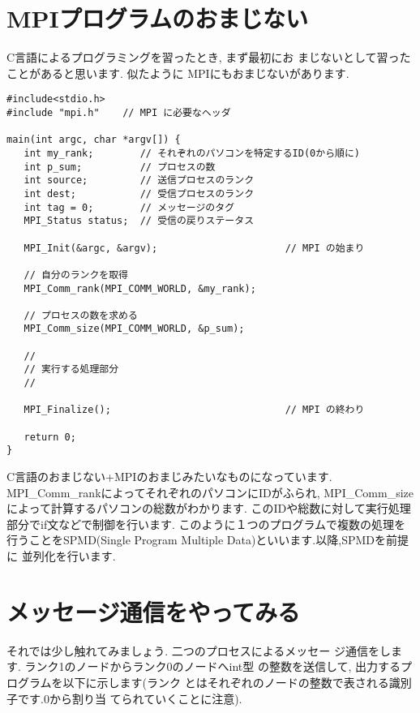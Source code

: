 \documentclass[a4paper,titlepage]{jreport}
\begin{document}
\section{MPIプログラムのおまじない}
C言語によるプログラミングを習ったとき, まず最初にお
まじないとして習ったことがあると思います. 似たように
MPIにもおまじないがあります.

\begin{verbatim}
#include<stdio.h>
#include "mpi.h"    // MPI に必要なヘッダ

main(int argc, char *argv[]) {
   int my_rank;        // それぞれのパソコンを特定するID(0から順に)
   int p_sum;          // プロセスの数
   int source;         // 送信プロセスのランク
   int dest;           // 受信プロセスのランク
   int tag = 0;        // メッセージのタグ
   MPI_Status status;  // 受信の戻りステータス

   MPI_Init(&argc, &argv);                      // MPI の始まり

   // 自分のランクを取得
   MPI_Comm_rank(MPI_COMM_WORLD, &my_rank);

   // プロセスの数を求める
   MPI_Comm_size(MPI_COMM_WORLD, &p_sum);

   //
   // 実行する処理部分
   //

   MPI_Finalize();                              // MPI の終わり

   return 0;
}
\end{verbatim}
C言語のおまじない+MPIのおまじみたいなものになっています.
MPI\_Comm\_rankによってそれぞれのパソコンにIDがふられ,
MPI\_Comm\_sizeによって計算するパソコンの総数がわかります.
このIDや総数に対して実行処理部分でif文などで制御を行います.
このように１つのプログラムで複数の処理を行うことをSPMD(Single
Program Multiple Data)といいます.以降,SPMDを前提に
並列化を行います.

\section{メッセージ通信をやってみる}
それでは少し触れてみましょう. 二つのプロセスによるメッセー
ジ通信をします. ランク1のノードからランク0のノードへint型
の整数を送信して, 出力するプログラムを以下に示します(ランク
とはそれぞれのノードの整数で表される識別子です.0から割り当
てられていくことに注意).
\end{document}

